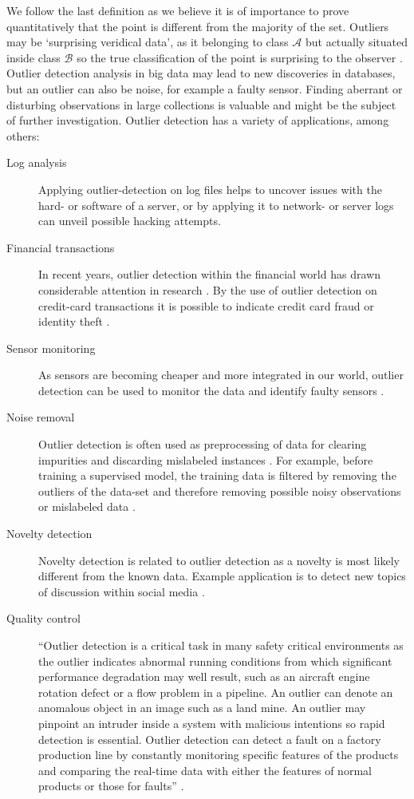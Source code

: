 We follow the last definition as we believe it is of importance to prove quantitatively that the point is different from the majority of the set. Outliers may be `surprising veridical data', as it belonging to class $\mathcal{A}$ but actually situated inside class $\mathcal{B}$ so the true classification of the point is surprising to the observer \cite{John95robustdecision}. Outlier detection analysis in big data may lead to new discoveries in databases, but an outlier can also be noise, for example a faulty sensor. Finding aberrant or disturbing observations in large collections is valuable and might be the subject of further investigation. Outlier detection has a variety of applications, among others:

\begin{description}
  \item[Log analysis] Applying outlier-detection on log files helps to uncover issues with the hard- or software of a server, or by applying it to network- or server logs can unveil possible hacking attempts. 
  \item[Financial transactions] In recent years, outlier detection within the financial world has drawn considerable attention in research \cite{Kanhere2014}. By the use of outlier detection on credit-card transactions it is possible to indicate credit card fraud or identity theft \cite{618940}.
  \item[Sensor monitoring] As sensors are becoming cheaper and more integrated in our world, outlier detection can be used to monitor the data and identify faulty sensors \cite{Fujimaki:2005:ASA:1081870.1081917}.
  \item[Noise removal] Outlier detection is often used as preprocessing of data for clearing impurities and discarding mislabeled instances \cite{Brodley96identifyingand}. For example, before training a supervised model, the training data is filtered by removing the outliers of the data-set and therefore removing possible noisy observations or mislabeled data \cite{63857}.
  \item[Novelty detection] Novelty detection is related to outlier detection as a novelty is most likely different from the known data. Example application is to detect new topics of discussion within social media \cite{Markou20032481,Markou20032499,SPC3:SPC3353}.
  \item[Quality control] ``Outlier detection is a critical task in many safety critical environments as the outlier indicates abnormal running conditions from which significant performance degradation may well result, such as an aircraft engine rotation defect or a flow problem in a pipeline. An outlier can denote an anomalous object in an image such as a land mine. An outlier may pinpoint an intruder inside a system with malicious intentions so rapid detection is essential. Outlier detection can detect a fault on a factory production line by constantly monitoring specific features of the products and comparing the real-time data with either the features of normal products or those for faults'' \cite{6416666}.
\end{description}

